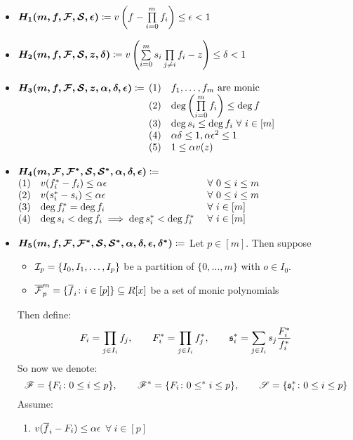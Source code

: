 \begin{itemize}
	\item $\boldsymbol{H_1(m,f,\mathcal{F},\mathcal{S},\epsilon)}\coloneqq v\left(f-\prod\limits_{i=0}^mf_i\right)\leq\epsilon<1$ 
	\item $\boldsymbol{H_2(m,f,\mathcal{F},\mathcal{S},z,\delta)}\coloneqq v\left(\sum\limits_{i=0}^m s_i\prod\limits_{j\neq i}f_i -z   \right)\leq \delta<1$
	\item $\boldsymbol{H_3(m,f,\mathcal{F},\mathcal{S},z,\alpha,\delta,\epsilon)}\coloneqq$ 
	$\begin{array}[t]{@{}rl@{}}
		(1) &f_1,\dots,f_m \text{ are monic}\\
		(2) &\deg\left(\prod\limits_{i=0}^mf_i\right)\leq \deg f\\
		(3) &\deg s_i\leq \deg f_i \ \forall\  i\in[m]\\
		(4) &\alpha\delta\leq 1, \alpha\epsilon^2\leq 1\\
		(5) &1\leq \alpha v(z)
	\end{array}$
	\item $\boldsymbol{H_4(m,\mathcal{F},\mathcal{F}^*,\mathcal{S},\mathcal{S}^*,\alpha,\delta,\epsilon)}\coloneqq$ $\begin{array}[t]{@{}rll@{}}
		(1) & v(f^*_i-f_i)\leq \alpha\eps\ &\forall\ 0\leq i\leq m\\
		(2) & v(s^*_i-s_i)\leq \alpha\eps\ &\forall\ 0\leq i\leq m\\
		(3) &\deg f_i^*= \deg f_i\ &\forall \ i\in[m]\\
		(4) &\deg s_i<\deg f_i\implies \deg s_i^*<\deg f_i^*\ &\forall\ i\in [m]
	\end{array}$
	\item $\boldsymbol{H_5(m,f,\mathcal{F},\mathcal{F}^*,\mathcal{S},\mathcal{S}^*, \alpha,\delta,\epsilon,\delta^*)}\coloneqq $ Let $p\in[m]$. Then suppose
	\begin{itemize}
		\item $\mathcal{I}_p=\{I_0,I_1,\dots,I_p\}$ be a partition of $\{0,\dots,m\}$ with $o\in I_0$. 
		\item $\overline{\mathcal{F}}_p^m=\{\overline{f}_i\colon i\in[p]\}\subseteq R[x]$ be a set of monic polynomials
	\end{itemize}
	Then define: $$F_i=\prod_{j\in I_i} f_j,\qquad F_i^*=\prod_{j\in I_i}f_j^*,\qquad \mathfrak{s}_i^*=\sum_{j\in I_i} s_j\frac{F_i^*}{f_i^*}$$So now we denote:$${\mathscr{F}}=\{F_i\colon 0\leq i\leq p\},\qquad {\mathscr{F}}^*=\{F_i\colon 0\leq^* i\leq p\}, \qquad {\mathscr{S}}=\{\mathfrak{s}_i^*\colon 0\leq i\leq p\} $$
	Assume:\begin{enumerate}
		\item $v(\overline{f}_i-F_i)\leq \alpha \epsilon $ $\forall \ i\in[p]$

\end{enumerate}
\end{itemize}
